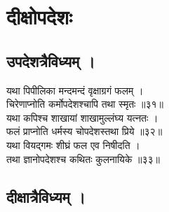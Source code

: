 \section{दीक्षोपदेशः}

\subsection{उपदेशत्रैविध्यम् ।}

यथा पिपीलिका मन्दमन्दं वृक्षाग्रगं फलम् ।\\[-2mm]
चिरेणाप्नोति कर्मोपदेशश्चापि तथा स्मृतः ॥३१॥\\
यथा कपिश्च शाखायां शाखामुल्लंघ्य यत्नतः ।\\[-2mm]
फलं प्राप्नोति धर्मस्य चोपदेशस्तथा प्रिये ॥३२॥\\
यथा वियद्गमः शीघ्रं फल एव निषीदति ।\\[-2mm]
तथा ज्ञानोपदेशश्च कथितः कुलनायिके ॥३३॥\\

\subsection{दीक्षात्रैविध्यम् ।}

